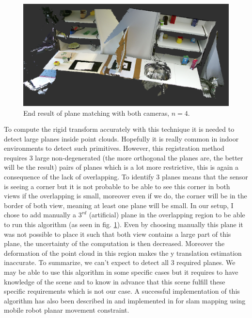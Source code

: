 \begin{figure}[h!]
    \centering
    \includegraphics[width=\textwidth]{images/reg2.png}
    \caption{End result of plane matching with both cameras, $n=4$.}
    \label{fig:planes_reg}
\end{figure}

To compute the rigid transform accurately with this technique it is needed to detect large planes inside point clouds. Hopefully it is really common in indoor environments to detect such primitives. However, this registration method requires 3 large non-degenerated (the more orthogonal the planes are, the better will be the result) pairs of planes which is a lot more restrictive, this is again a consequence of the lack of overlapping. To identify 3 planes means that the sensor is seeing a corner but it is not probable to be able to see this corner in both views if the overlapping is small, moreover even if we do, the corner will be in the border of both view, meaning at least one plane will be small. In our setup, I chose to add manually a $3^{rd}$ (artificial) plane in the overlapping region to be able to run this algorithm (as seen in fig. \ref{fig:planes_reg}). Even by choosing manually this plane it was not possible to place it such that both view contains a large part of this plane, the uncertainty of the computation is then decreased. Moreover the deformation of the point cloud in this region makes the y translation estimation inaccurate.
To summarize, we can't expect to detect all 3 required planes. We may be able to use this algorithm in some specific cases but it requires to have knowledge of the scene and to know in advance that this scene fulfill these specific requirements which is not our case. A successful implementation of this algorithm has also been described in \cite{aravindh} and implemented in \cite{zyuan13} for \acrshort{slam} mapping using mobile robot planar movement constraint.